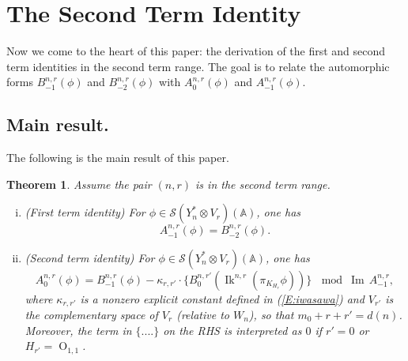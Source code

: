 \documentclass[10pt]{amsart}
\theoremstyle{plain}
\newtheorem{Thm}[equation]{Theorem}
\numberwithin{equation}{section}
\begin{document}
\vskip 15pt

\section{\bf The  Second Term Identity}
Now we come to the heart of this paper: the derivation of the first
and second term identities in the second term range. The goal is to
relate the automorphic forms $B^{n,r}_{-1}(\phi)$ and
$B^{n,r}_{-2}(\phi)$  with $A^{n,r}_{0}(\phi)$ and
$A^{n,r}_{-1}(\phi)$.
 
 \vskip 10pt
 \subsection{\bf Main result.}
 The following is the main result of this paper.
 \vskip 5pt
 
 \begin{Thm} \label{T:main}
Assume the pair $(n, r)$ is in the second term range.
\begin{enumerate}[(i)]
 \item (First term identity) For $\phi \in  \mathcal{S}(Y_n^* \otimes
   V_r)({\mathbb{A}})$, one has
 \[   A^{n,r}_{-1}(\phi) =  B^{n,r}_{-2}(\phi). \]
 \item (Second term identity)  For $\phi \in  \mathcal{S}(Y_n^* \otimes V_r)({\mathbb{A}})$, one has
  \[   A^{n,r}_0(\phi)  =   B^{n,r}_{-1}(\phi)  -
  \kappa_{r, r'} \cdot
\{  B^{n,r'}_0({\operatorname{Ik}}^{n,r}(\pi_{K_{H_r}}\phi)) \}  \, \mod{{\operatorname{Im\,}}
  A^{n,r}_{-1}}, \]
 where $\kappa_{r,r'}$ is a nonzero explicit constant defined in
 (\ref{E:iwasawa}) and $V_{r'}$ is the complementary space of $V_r$
 (relative to $W_n$), so that $m_0+r+r' = d(n)$. Moreover, the term in $\{ ....\}$ on the RHS is interpreted as $0$ if $r' = 0$ or $H_{r'} = {\operatorname{O}}_{1,1}$.  
\end{enumerate}
 \end{Thm}
 
 \vskip 10pt
   
\end{document}
